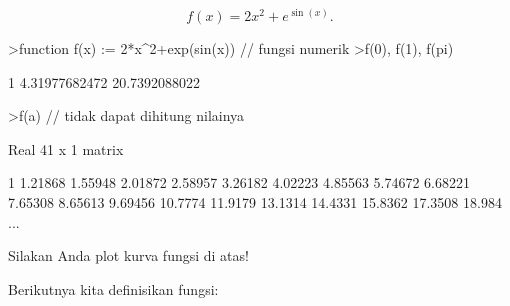 \documentclass[a4paper,10pt]{article}
\begin{document}
\begin{eulernotebook}
\begin{eulercomment}
\end{eulercomment}
\begin{eulerformula}
\[
f(x)=2x^2+e^{\sin(x)}.
\]
\end{eulerformula}
\begin{eulerprompt}
>function f(x) := 2*x^2+exp(sin(x)) // fungsi numerik
>f(0), f(1), f(pi)
\end{eulerprompt}
\begin{euleroutput}
  1
  4.31977682472
  20.7392088022
\end{euleroutput}
\begin{eulerprompt}
>f(a) // tidak dapat dihitung nilainya
\end{eulerprompt}
\begin{euleroutput}
  Real 41 x 1 matrix
  
              1 
        1.21868 
        1.55948 
        2.01872 
        2.58957 
        3.26182 
        4.02223 
        4.85563 
        5.74672 
        6.68221 
        7.65308 
        8.65613 
        9.69456 
        10.7774 
        11.9179 
        13.1314 
        14.4331 
        15.8362 
        17.3508 
         18.984 
      ...
\end{euleroutput}
\begin{eulercomment}
Silakan Anda plot kurva fungsi di atas!

Berikutnya kita definisikan fungsi:


\end{eulercomment}
\end{eulernotebook}
\end{document}
